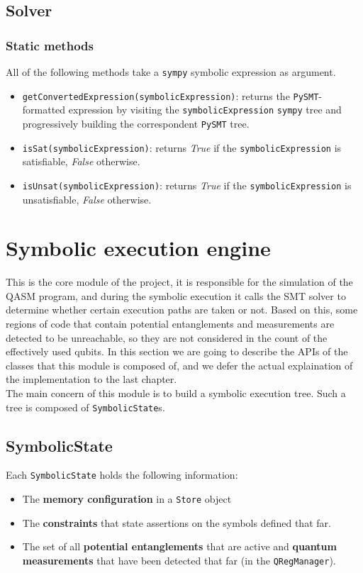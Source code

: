 \documentclass[12pt,a4paper]{report}
\theoremstyle{definition}
\theoremstyle{definition}
\theoremstyle{definition}
\begin{document}
\subsection{Solver}
\subsubsection{Static methods}
All of the following methods take a \texttt{sympy} symbolic expression as argument.
\begin{itemize}
    \itemsep 0em
    \item \texttt{getConvertedExpression(symbolicExpression)}: returns the \texttt{PySMT}-formatted expression by visiting the \texttt{symbolicExpression} \texttt{sympy} tree and progressively building the correspondent \texttt{PySMT} tree.
    \item \texttt{isSat(symbolicExpression)}: returns \textit{True} if the \texttt{symbolicExpression} is satisfiable, \textit{False} otherwise.
    \item \texttt{isUnsat(symbolicExpression)}: returns \textit{True} if the \texttt{symbolicExpression} is unsatisfiable, \textit{False} otherwise.
\end{itemize}


\section{Symbolic execution engine}
This is the core module of the project, it is responsible for the simulation of the QASM program, and during the symbolic execution it calls the SMT solver to determine whether certain execution paths are taken or not. Based on this, some regions of code that contain potential entanglements and measurements are detected to be unreachable, so they are not considered in the count of the effectively used qubits. In this section we are going to describe the APIs of the classes that this module is composed of, and we defer the actual explaination of the implementation to the last chapter.\\
The main concern of this module is to build a symbolic execution tree. Such a tree is composed of \texttt{SymbolicState}s.

\subsection{SymbolicState}
Each \texttt{SymbolicState} holds the following information:
\begin{itemize}
    \itemsep 0em
    \item The \textbf{memory configuration} in a \texttt{Store} object
    \item The \textbf{constraints} that state assertions on the symbols defined that far.
    \item The set of all \textbf{potential entanglements} that are active and \textbf{quantum measurements} that have been detected that far (in the \texttt{QRegManager}).
\end{itemize}
\end{document}
